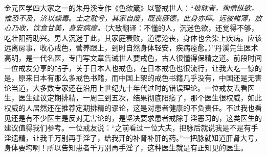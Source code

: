 \begin{case}
    金元医学四大家之一的朱丹溪专作《色欲箴》以警戒世人：“\textit{彼昧者，徇情纵欲，惟恐不及，济以燥毒。士之耽兮，其家自废，既丧厥德，此身亦瘁。远彼帷薄，放心乃收，饮食甘美，身安病瘳。}（大致翻译：不懂的人，沉迷色欲，还觉得不够，吃壮阳药助兴。男人沉迷于此，其家庭衰败，道德沦丧，身体也会染上疾病。应该远离房事，收心戒色，营养跟上，到时自然身体轻安，疾病痊愈。）”丹溪先生医术高明，是一代名医，专门写文章告诫世人要戒色，古人很懂得保精之道。前段时间一位戒友分享的帖子，关于日本人也戒色，在日本戒色也很流行，让我大吃一惊的是，原来日本有那么多戒色书籍，而中国上架的戒色书籍几乎没有，中国还是无害论当道，大多数专家还在沿用上世纪九十年代过时的错误理论。一位戒友去看医生，医生建议定期排精，一周三到五次，结果彻底阳痿了，那个医生很权威，如此权威的人居然还在推荐定期排精的谬论，这是对患者健康的不负责任。不过我也看见还是有不少医生是反对无害论的，是坚决要求患者戒除手淫恶习的，这类医生的建议值得我们参考。一位戒友说：“之前看过一位大夫，把脉后就说我是不是有手淫遗精，让我千万别再手淫了，给我开的补肾补肝的药。”一把脉就知道肝肾大亏，身体要垮啊！所以告知患者千万别再手淫了，这种医生就是有正知见的医生。
\end{case}

